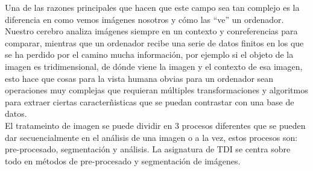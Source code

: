 \documentclass[a4paper,12pt]{report}
\begin{document}
Una de las razones principales que hacen que este campo sea tan complejo es la diferencia en como vemos imágenes nosotros y cómo las ``ve'' un ordenador. Nuestro cerebro analiza imágenes siempre en un contexto y conreferencias para comparar, mientras que un ordenador recibe una serie de datos finitos en los que se ha perdido por el camino mucha información, por ejemplo si el objeto de la imagen es tridimensional, de dónde viene la imagen y el contexto de esa imagen, esto hace que cosas para la vista humana obvias para un ordenador sean operaciones muy complejas que requieran múltiples transformaciones y algoritmos para extraer ciertas caracterñisticas que se puedan contrastar con una base de datos.\\

El tratameinto de imagen se puede dividir en 3 procesos diferentes que se pueden dar secuencialmente en el análisis de una imagen o a la vez, estos procesos son: pre-procesado, segmentación y análisis. La asignatura de TDI se centra sobre todo en métodos de pre-procesado y segmentación de imágenes.\\ 
\end{document}
